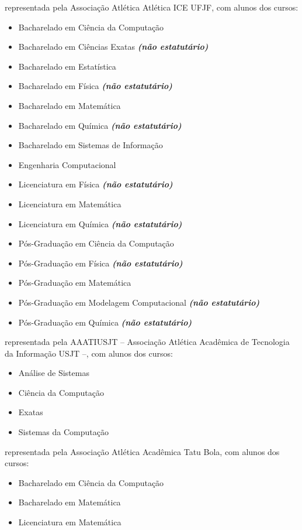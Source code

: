\begin{article}
\begin{description}[noitemsep]
		\item[UFJF] representada pela Associação Atlética Atlética ICE UFJF, com alunos dos cursos:
		\begin{itemize}[noitemsep]
			\item Bacharelado em Ciência da Computação
			\item Bacharelado em Ciências Exatas \textbf{\textit{(não estatutário)}}
			\item Bacharelado em Estatística
			\item Bacharelado em Física \textbf{\textit{(não estatutário)}}
			\item Bacharelado em Matemática
			\item Bacharelado em Química \textbf{\textit{(não estatutário)}}
			\item Bacharelado em Sistemas de Informação
			\item Engenharia Computacional
			\item Licenciatura em Física \textbf{\textit{(não estatutário)}}
			\item Licenciatura em Matemática
			\item Licenciatura em Química \textbf{\textit{(não estatutário)}}
			\item Pós-Graduação em Ciência da Computação
			\item Pós-Graduação em Física \textbf{\textit{(não estatutário)}}
			\item Pós-Graduação em Matemática
			\item Pós-Graduação em Modelagem Computacional \textbf{\textit{(não estatutário)}}
			\item Pós-Graduação em Química \textbf{\textit{(não estatutário)}}
		\end{itemize}

		\item[Universidade São Judas Tadeu] representada pela AAATIUSJT -- Associação Atlética Acadêmica de Tecnologia da Informação USJT --, com alunos dos cursos:
		\begin{itemize}[noitemsep]
			\item Análise de Sistemas
			\item Ciência da Computação
			\item Exatas
			\item Sistemas da Computação
		\end{itemize}

		\item[UNESP - Rio Claro] representada pela Associação Atlética Acadêmica Tatu Bola, com alunos dos cursos:
		\begin{itemize}[noitemsep]
			\item Bacharelado em Ciência da Computação
			\item Bacharelado em Matemática
			\item Licenciatura em Matemática
		\end{itemize}


\end{description}
\end{article}
